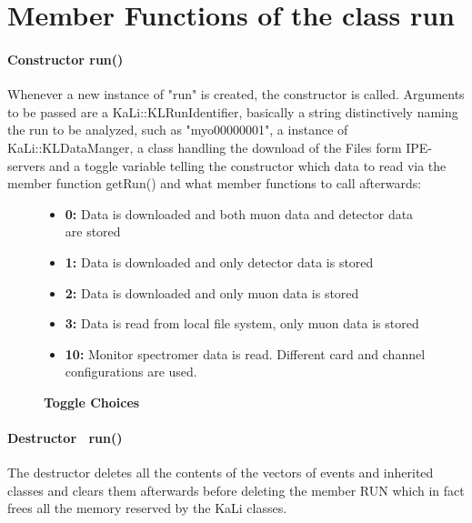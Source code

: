   \section{Member Functions of the class {\bf run}}
  \label{ch:Analysis software:sec:methods of the class run}
  
    \paragraph{Constructor run()}
    \label{ch:Analysis software:sec:methods of the class run:subsec:Constructor}
    Whenever a new instance of "run" is created, the constructor is called. Arguments to be passed are a KaLi::KLRunIdentifier, basically a string distinctively naming the run to be analyzed, such as "myo00000001", a instance of KaLi::KLDataManger, a class handling the download of the Files form IPE-servers and a toggle variable telling the constructor which data to read via the member function getRun() and what member functions to call afterwards:
    \begin{figure}
    \caption*{\bf Toggle Choices}
    	\begin{itemize}
    		\item {\bf 0:} Data is downloaded and both muon data and detector data are stored
    		\item {\bf 1:} Data is downloaded and only detector data is stored
    		\item {\bf 2:} Data is downloaded and only muon data is stored
    		\item {\bf 3:} Data is read from local file system, only muon data is stored
    		\item {\bf  10:} Monitor spectromer data is read. Different card and channel configurations are used.
    	\end{itemize}
    \end{figure}
    
    \paragraph{Destructor ~run()}
    \label{ch:Analysis software:sec:methods of the class run:subsec:destructor}
    The destructor deletes all the contents of the vectors of events and inherited classes and clears them afterwards before deleting the member RUN which in fact frees all the memory reserved by the KaLi classes.
    
